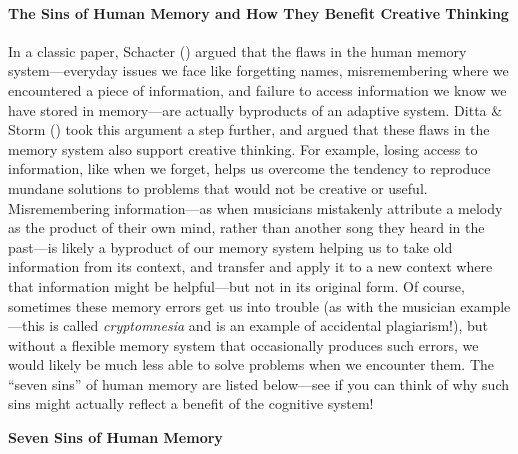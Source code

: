 \documentclass[
]{krantz}
\begin{document}
\paragraph*{The Sins of Human Memory and How They Benefit Creative Thinking}\label{the-sins-of-human-memory-and-how-they-benefit-creative-thinking}

In a classic paper, Schacter () argued that the flaws in the human memory system---everyday issues we face like forgetting names, misremembering where we encountered a piece of information, and failure to access information we know we have stored in memory---are actually byproducts of an adaptive system. Ditta \& Storm () took this argument a step further, and argued that these flaws in the memory system also support creative thinking. For example, losing access to information, like when we forget, helps us overcome the tendency to reproduce mundane solutions to problems that would not be creative or useful. Misremembering information---as when musicians mistakenly attribute a melody as the product of their own mind, rather than another song they heard in the past---is likely a byproduct of our memory system helping us to take old information from its context, and transfer and apply it to a new context where that information might be helpful---but not in its original form. Of course, sometimes these memory errors get us into trouble (as with the musician example---this is called \emph{cryptomnesia} and is an example of accidental plagiarism!), but without a flexible memory system that occasionally produces such errors, we would likely be much less able to solve problems when we encounter them. The ``seven sins'' of human memory are listed below---see if you can think of why such sins might actually reflect a benefit of the cognitive system!

\textbf{Seven Sins of Human Memory}
\end{document}
